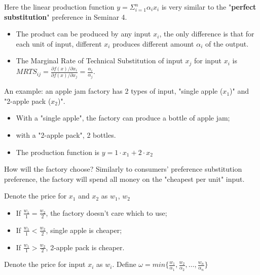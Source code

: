 \documentclass{article}
\begin{document}
\begin{mdframed}[backgroundcolor=blue!20,linecolor=white]

Here the linear production function $y = \Sigma^n_{i=1} \alpha_i x_i$ is very similar to the "\textbf{perfect substitution}" preference in Seminar 4.

\begin{itemize}

\item  The product can be produced by any input $x_i$, the only difference is that for each unit of input, different $x_i$ produces different amount $\alpha_i$ of the output. 

\item  The Marginal Rate of Technical Substitution of input $x_j$ for input $x_i$ is $MRTS_{ij} = \frac{\partial f(x)/ \partial x_i}{\partial f(x)/ \partial x_j} = \frac{\alpha_i}{\alpha_j}$.

\end{itemize}

An example: an apple jam factory has 2 types of input, "single apple ($x_1$)" and "2-apple pack ($x_2$)".

\begin{itemize}
\item With a "single apple", the factory can produce a bottle of apple jam;
\item with a "2-apple pack", 2 bottles.
\item The production function is $y = 1 \cdot x_1 + 2 \cdot x_2$
\end{itemize}

How will the factory choose? Similarly to consumers' preference substitution preference, the factory will spend all money on the "cheapest per unit" input. 

Denote the price for $x_1$ and $x_2$ as $w_1$, $w_2$
\begin{itemize}
\item If $\frac{w_1}{1} = \frac{w_2}{2}$, the factory doesn't care which to use;
\item If $\frac{w_1}{1} < \frac{w_2}{2}$, single apple is cheaper;
\item If $\frac{w_1}{1} > \frac{w_2}{2}$, 2-apple pack is cheaper.
\end{itemize}

\end{mdframed}


Denote the price for input $x_i$  as $w_i$. Define $\omega = min \{\frac{w_1}{\alpha_1}, \frac{w_2}{\alpha_2}, \dots ,\frac{w_n}{\alpha_n}\} $
\end{document}
